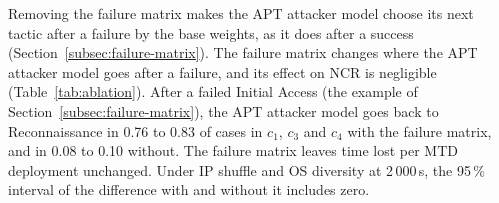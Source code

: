 \documentclass{cshonours}
\begin{document}
Removing the failure matrix makes the APT attacker model choose its next
tactic after a failure by the base weights, as it does after a success
(Section~\ref{subsec:failure-matrix}). The failure matrix changes where the
APT attacker model goes after a failure, and its effect on NCR is negligible
(Table~\ref{tab:ablation}). After a failed Initial Access (the example of
Section~\ref{subsec:failure-matrix}), the APT attacker model goes back to
Reconnaissance in 0.76 to 0.83 of cases in $c_1$, $c_3$ and $c_4$ with the
failure matrix, and in 0.08 to 0.10 without.
The failure matrix leaves time lost per MTD deployment unchanged. Under IP
shuffle and OS diversity at 2\,000\,s, the 95\,\% interval of the
difference with and without it includes zero.
\end{document}
